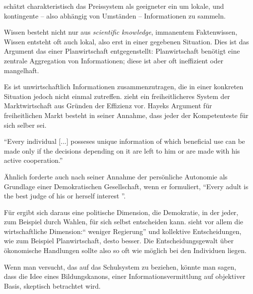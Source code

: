 \citeauthor{hayek-1945} schätzt charakteristisch das Preissystem als geeigneter ein um lokale, und kontingente – also abhängig von Umständen – Informationen zu sammeln.

Wissen besteht nicht nur aus \emph{scientific knowledge}, immanentem Faktenwissen,  Wissen entsteht oft auch lokal, also erst in einer gegebenen Situation.
Dies ist das Argument das \citeauthor{hayek-1945} einer Planwirtschaft entgegenstellt:
Planwirtschaft benötigt eine zentrale Aggregation von Informationen; diese ist aber oft ineffizient oder mangelhaft.

Es ist unwirtschaftlich Informationen zusammenzutragen, die in einer konkreten Situation jedoch nicht einmal zutreffen.
\citeauthor{hayek-1945} zieht ein freiheitlicheres System der Marktwirtschaft aus Gründen der Effizienz vor.
Hayeks Argument für freiheitlichen Markt besteht in seiner Annahme, dass jeder der Kompetenteste für sich selber sei.

	``Every individual [...] posseses unique information of which beneficial use can be made only if the decisions depending on it are left to him or are made with his active cooperation.'' \parencite[521]{Hayek-1945}

Ähnlich forderte \citeauthor{Dahl-1989-aa} auch nach seiner Annahme der persönliche Autonomie als Grundlage einer Demokratischen Gesellschaft, wenn er formuliert,
``Every adult is the best judge of his or herself interest ''\parencite[100]{Dahl-1989-aa}.

Für \citeauthor{Dahl-1989-aa} ergibt sich daraus eine politische Dimension, die Demokratie, in der jeder, zum Beispiel durch Wahlen, für sich selbst entscheiden kann.
\citeauthor{hayek-1945}  sieht vor allem die wirtschaftliche Dimension:`` weniger Regierung'' \parencite[527f.]{hayek-1945} und kollektive Entscheidungen, wie zum Beispiel Planwirtschaft, desto besser.
Die Entscheidungsgewalt über ökonomische Handlungen sollte also so oft wie möglich bei den Individuen liegen.

Wenn man versucht, das auf das Schulsystem zu beziehen, könnte man sagen, dass die Idee eines Bildungskanons, einer Informationsvermittlung auf objektiver Basis, skeptisch betrachtet wird.

